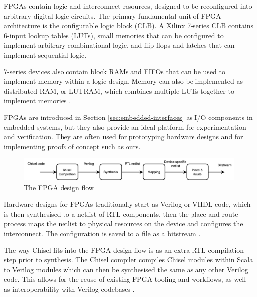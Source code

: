 FPGAs contain logic and interconnect resources, designed to be reconfigured into arbitrary digital logic circuits. The primary fundamental unit of FPGA architecture is the configurable logic block (CLB). A Xilinx 7-series CLB contains 6-input lookup tables (LUTs), small memories that can be configured to implement arbitrary combinational logic, and flip-flops and latches that can implement sequential logic.

7-series devices also contain block RAMs and FIFOs that can be used to implement memory within a logic design. Memory can also be implemented as distributed RAM, or LUTRAM, which combines multiple LUTs together to implement memories \cite{fpga_arch}.

FPGAs are introduced in Section \ref{sec:embedded-interfaces} as I/O components in embedded systems, but they also provide an ideal platform for experimentation and verification. They are often used for prototyping hardware designs and for implementing proofs of concept such as ours.

\begin{figure}[h!]
    \centering
    \includegraphics[width=\textwidth]{../img/design-flow.png}
    \caption{The FPGA design flow}
    \label{fig:design-flow}
\end{figure}

Hardware designs for FPGAs traditionally start as Verilog or VHDL code, which is then synthesised to a netlist of RTL components, then the place and route process maps the netlist to physical resources on the device and configures the interconnect. The configuration is saved to a file as a bitstream \cite{vivado_design}.

The way Chisel fits into the FPGA design flow is as an extra RTL compilation step prior to synthesis. The Chisel compiler compiles Chisel modules within Scala to Verilog modules which can then be synthesised the same as any other Verilog code. This allows for the reuse of existing FPGA tooling and workflows, as well as interoperability with Verilog codebases \cite{chisel}.


